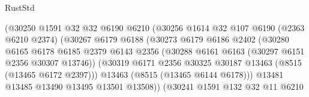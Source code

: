 \begin{lexlean}{RustStd}
\begin{coremodule}
                                    (@30250
                                      @1591
                                      @32
                                      @32
                                      @6190
                                      @6210
                                      (@30256
                                        @1614
                                        @32
                                        @107
                                        @6190
                                        (@2363 @6210 @2374)
                                        (@30267
                                          @6179
                                          @6188
                                          (@30273
                                            @6179
                                            @6186
                                            @2402
                                            (@30280
                                              @6165
                                              @6178
                                              @6185
                                              @2379
                                              @6143
                                              @2356
                                              (@30288
                                                @6161
                                                @6163
                                                (@30297 @6151 @2356 @30307 @13746))
                                              (@30319
                                                @6171
                                                @2356
                                                @30325
                                                @30187
                                                @13463
                                                (@8515 (@13465 @6172 @2397)))
                                              @13463
                                              (@8515 (@13465 @6144 @6178)))
                                            @13481
                                            @13485
                                            @13490
                                            @13495
                                            @13501
                                            @13508))
                                        (@30241
                                          @1591
                                          @132
                                          @32
                                          @11
                                          @6210

\end{coremodule}
\end{lexlean}
